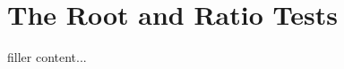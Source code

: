 \documentclass[../../templates/section]{subfiles}
\begin{document}
\section{The Root and Ratio Tests}\label{sec:the-root-and-ratio-tests}

filler content...
\end{document}
